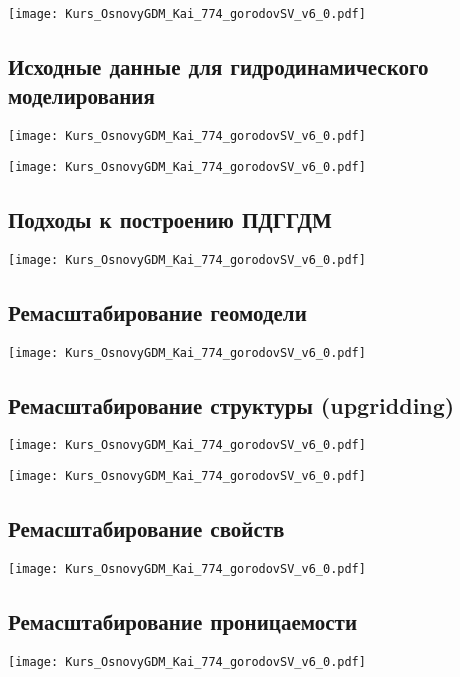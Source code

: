 \documentclass[main.tex]{subfiles}
\begin{document}
\texttt{[image: Kurs\_OsnovyGDM\_Kai\_774\_gorodovSV\_v6\_0.pdf]}

\subsection{Исходные данные для гидродинамического моделирования}

\texttt{[image: Kurs\_OsnovyGDM\_Kai\_774\_gorodovSV\_v6\_0.pdf]}

\texttt{[image: Kurs\_OsnovyGDM\_Kai\_774\_gorodovSV\_v6\_0.pdf]}

\subsection{Подходы к построению ПДГГДМ}

\texttt{[image: Kurs\_OsnovyGDM\_Kai\_774\_gorodovSV\_v6\_0.pdf]}

\subsection{Ремасштабирование геомодели}

\texttt{[image: Kurs\_OsnovyGDM\_Kai\_774\_gorodovSV\_v6\_0.pdf]}

\subsection{Ремасштабирование структуры (upgridding)}

\texttt{[image: Kurs\_OsnovyGDM\_Kai\_774\_gorodovSV\_v6\_0.pdf]}

\texttt{[image: Kurs\_OsnovyGDM\_Kai\_774\_gorodovSV\_v6\_0.pdf]}

\subsection{Ремасштабирование свойств}

\texttt{[image: Kurs\_OsnovyGDM\_Kai\_774\_gorodovSV\_v6\_0.pdf]}

\subsection{Ремасштабирование проницаемости}

\texttt{[image: Kurs\_OsnovyGDM\_Kai\_774\_gorodovSV\_v6\_0.pdf]}
\end{document}
